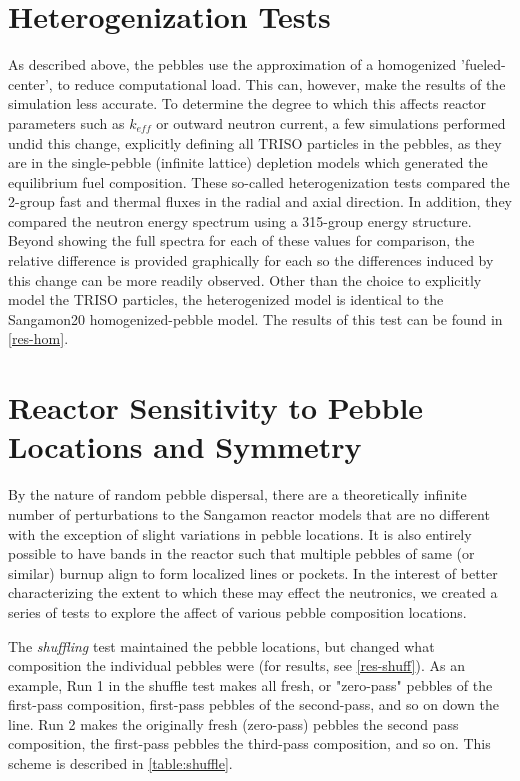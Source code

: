 \section{Heterogenization Tests}
\label{het-test-meth}

As described above, the pebbles use the approximation of a homogenized 'fueled-center', to reduce computational load.  This can, however, make the results of the simulation less accurate.  To determine the degree to which this affects reactor parameters such as $k_{eff}$ or outward neutron current, a few simulations performed undid this change, explicitly defining all TRISO particles in the pebbles, as they are in the single-pebble (infinite lattice) depletion models which generated the equilibrium fuel composition.  These so-called heterogenization tests compared the 2-group fast and thermal fluxes in the radial and axial direction.  In addition, they compared the neutron energy spectrum using a 315-group energy structure.  Beyond showing the full spectra for each of these values for comparison, the relative difference is provided graphically for each so the differences induced by this change can be more readily observed.  Other than the choice to explicitly model the TRISO particles, the heterogenized model is identical to the Sangamon20 homogenized-pebble model.  The results of this test can be found in \autoref{res-hom}.

\section{Reactor Sensitivity to Pebble Locations and Symmetry}
\label{meth-sens}

By the nature of random pebble dispersal, there are a theoretically infinite number of perturbations to the Sangamon reactor models that are no different with the exception of slight variations in pebble locations.  It is also entirely possible to have bands in the reactor such that multiple pebbles of same (or similar) burnup align to form localized lines or pockets.  In the interest of better characterizing the extent to which these may effect the neutronics, we created a series of tests to explore the affect of various pebble composition locations.  

The \emph{shuffling} test maintained the pebble locations, but changed what composition the individual pebbles were (for results, see \autoref{res-shuff}).  As an example, Run 1 in the shuffle test makes all fresh, or "zero-pass" pebbles of the first-pass composition, first-pass pebbles of the second-pass, and so on down the line.  Run 2 makes the originally fresh (zero-pass) pebbles the second pass composition, the first-pass pebbles the third-pass composition, and so on. This scheme is described in \ref{table:shuffle}.

